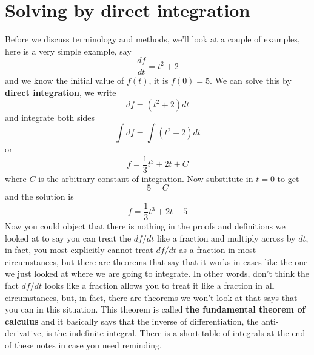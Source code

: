 \documentclass[12pt]{article}
\begin{document}
\section*{Solving by direct integration}
Before we discuss terminology and methods, we'll look at a couple of examples, here is a very simple example, say
\begin{equation}
  \frac{df}{dt}=t^2+2
\end{equation}
and we know the initial value of $f(t)$, it is $f(0)=5$. We can solve this by \textbf{direct integration}, we write
\begin{equation}
  df=(t^2+2)dt
\end{equation}
and integrate both sides
\begin{equation}
  \int df = \int (t^2+2)dt
\end{equation}
or
\begin{equation}
  f=\frac{1}{3}t^3+2t+C
\end{equation}
where $C$ is the arbitrary constant of integration. Now substitute in $t=0$ to get
\begin{equation}
  5=C
\end{equation}
and the solution is
\begin{equation}
  f=\frac{1}{3}t^3+2t+5
\end{equation}
Now you could object that there is nothing in the proofs and
definitions we looked at to say you can treat the $df/dt$ like a
fraction and multiply across by $dt$, in fact, you most explicitly
cannot treat $df/dt$ as a fraction in most circumstances, but there
are theorems that say that it works in cases like the one we just
looked at where we are going to integrate. In other words, don't think
the fact $df/dt$ looks like a fraction allows you to treat it like a
fraction in all circumstances, but, in fact, there are theorems we
won't look at that says that you can in this situation. This theorem
is called \textbf{the fundamental theorem of calculus} and it
basically says that the inverse of differentiation, the
anti-derivative, is the indefinite integral. There is a short table of
integrals at the end of these notes in case you need reminding.
\end{document}
